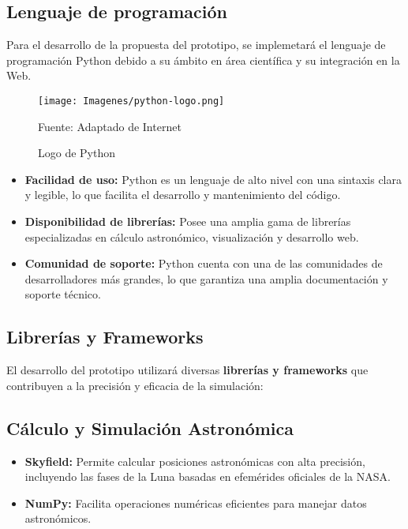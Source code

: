 \subsection*{Lenguaje de programación}
Para el desarrollo de la propuesta del prototipo, se implemetará el lenguaje de programación Python debido 
a su ámbito en área científica y su integración en la Web.

\begin{figure}[H]
    \texttt{[image: Imagenes/python-logo.png]}
    \centering
    \caption{Logo de Python}{Fuente: Adaptado de Internet}
\end{figure}

\begin{itemize}
    \item \textbf{Facilidad de uso:} Python es un lenguaje de alto nivel con una sintaxis clara y legible, lo que facilita el desarrollo y mantenimiento del código.
    \item \textbf{Disponibilidad de librerías:} Posee una amplia gama de librerías especializadas en cálculo astronómico, visualización y desarrollo web.
    \item \textbf{Comunidad de soporte:} Python cuenta con una de las comunidades de desarrolladores más grandes, lo que garantiza una amplia documentación y soporte técnico.
\end{itemize}

\subsection*{Librerías y Frameworks}

El desarrollo del prototipo utilizará diversas \textbf{librerías y frameworks} que contribuyen a la precisión y eficacia de la simulación:

\subsection*{Cálculo y Simulación Astronómica}
\begin{itemize}
    \item \textbf{Skyfield:} Permite calcular posiciones astronómicas con alta precisión, incluyendo las fases de la Luna basadas en efemérides oficiales de la NASA.
    \item \textbf{NumPy:} Facilita operaciones numéricas eficientes para manejar datos astronómicos.
\end{itemize}

